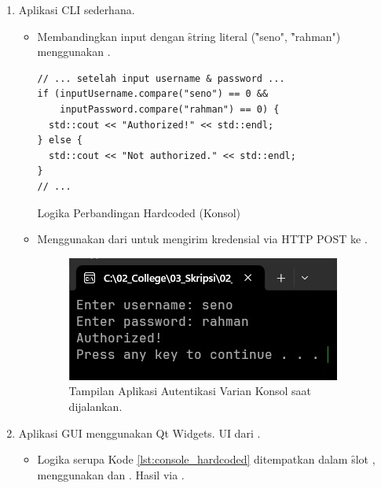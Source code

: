 \begin{enumerate}
	\item {} Aplikasi CLI sederhana.
	      \begin{itemize}
		      \item {} Membandingkan input  dengan \f{string} literal (\f{"seno"}, \f{"rahman"}) menggunakan .
		            \begin{listing}[H] %
			            \begin{verbatim}
// ... setelah input username & password ...
if (inputUsername.compare("seno") == 0 &&
    inputPassword.compare("rahman") == 0) {
  std::cout << "Authorized!" << std::endl;
} else {
  std::cout << "Not authorized." << std::endl;
}
// ...
                    \end{verbatim}
			            \caption{Logika Perbandingan Hardcoded (Konsol)}
			            \label{lst:console_hardcoded}
		            \end{listing}
		      \item {} Menggunakan  dari  untuk mengirim kredensial via HTTP POST ke .
\begin{figure}[H]
	          \centering
	          \includegraphics[height=0.25\textheight]{assets/pics/console_app.jpeg} %
	          \caption{Tampilan Aplikasi Autentikasi Varian Konsol saat dijalankan.}
	          \label{fig:console_app_ui}
	      \end{figure}
	      \end{itemize}
	\item {} Aplikasi GUI menggunakan Qt Widgets. UI dari .
	      \begin{itemize}
		      \item {} Logika serupa Kode \ref{lst:console_hardcoded} ditempatkan dalam \f{slot} , menggunakan  dan . Hasil via .

\end{itemize}
\end{enumerate}
